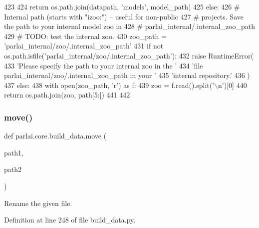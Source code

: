 \begin{DoxyCode}
423 
424         \textcolor{keywordflow}{return} os.path.join(datapath, \textcolor{stringliteral}{'models'}, model\_path)
425     \textcolor{keywordflow}{else}:
426         \textcolor{comment}{# Internal path (starts with "izoo:") -- useful for non-public}
427         \textcolor{comment}{# projects.  Save the path to your internal model zoo in}
428         \textcolor{comment}{# parlai\_internal/.internal\_zoo\_path}
429         \textcolor{comment}{# TODO: test the internal zoo.}
430         zoo\_path = \textcolor{stringliteral}{'parlai\_internal/zoo/.internal\_zoo\_path'}
431         \textcolor{keywordflow}{if} \textcolor{keywordflow}{not} os.path.isfile(\textcolor{stringliteral}{'parlai\_internal/zoo/.internal\_zoo\_path'}):
432             \textcolor{keywordflow}{raise} RuntimeError(
433                 \textcolor{stringliteral}{'Please specify the path to your internal zoo in the '}
434                 \textcolor{stringliteral}{'file parlai\_internal/zoo/.internal\_zoo\_path in your '}
435                 \textcolor{stringliteral}{'internal repository.'}
436             )
437         \textcolor{keywordflow}{else}:
438             with open(zoo\_path, \textcolor{stringliteral}{'r') as f:}
439 \textcolor{stringliteral}{                zoo = f.read().split('\(\backslash\)n'})[0]
440             \textcolor{keywordflow}{return} os.path.join(zoo, path[5:])
441 
442 
\end{DoxyCode}
\mbox{\label{namespaceparlai_1_1core_1_1build__data_a1678b8a042eeb9d9c8e9de08f52e496b}} 
\subsubsection{\texorpdfstring{move()}{move()}}
{\footnotesize\ttfamily def parlai.\+core.\+build\+\_\+data.\+move (\begin{DoxyParamCaption}\item[{}]{path1,  }\item[{}]{path2 }\end{DoxyParamCaption})}

\begin{DoxyVerb}Rename the given file.
\end{DoxyVerb}
 

Definition at line 248 of file build\+\_\+data.\+py.


